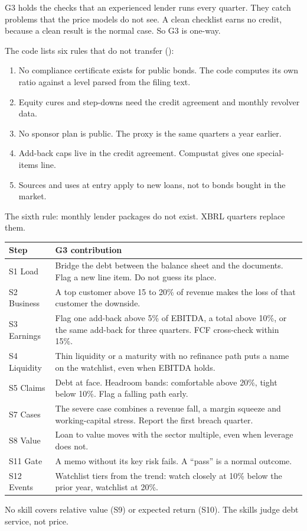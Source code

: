 G3 holds the checks that an experienced lender runs every quarter. They catch problems that the price models do not see. A clean checklist earns no credit, because a clean result is the normal case. So G3 is one-way.

The code lists six rules that do not transfer ():
\begin{enumerate}
\item No compliance certificate exists for public bonds. The code computes its own ratio against a level parsed from the filing text.
\item Equity cures and step-downs need the credit agreement and monthly revolver data.
\item No sponsor plan is public. The proxy is the same quarters a year earlier.
\item Add-back caps live in the credit agreement. Compustat gives one special-items line.
\item Sources and uses at entry apply to new loans, not to bonds bought in the market.
\end{enumerate}
The sixth rule: monthly lender packages do not exist. XBRL quarters replace them.

{\footnotesize
\begin{tabularx}{\linewidth}{@{}>{\raggedright\arraybackslash}p{24mm}>{\raggedright\arraybackslash}X@{}}
\toprule
Step & G3 contribution \\
\midrule
S1 Load & Bridge the debt between the balance sheet and the documents. Flag a new line item. Do not guess its place. \\
S2 Business & A top customer above 15 to 20\% of revenue makes the loss of that customer the downside. \\
S3 Earnings & Flag one add-back above 5\% of EBITDA, a total above 10\%, or the same add-back for three quarters. FCF cross-check within 15\%. \\
S4 Liquidity & Thin liquidity or a maturity with no refinance path puts a name on the watchlist, even when EBITDA holds. \\
S5 Claims & Debt at face. Headroom bands: comfortable above 20\%, tight below 10\%. Flag a falling path early. \\
S7 Cases & The severe case combines a revenue fall, a margin squeeze and working-capital stress. Report the first breach quarter. \\
S8 Value & Loan to value moves with the sector multiple, even when leverage does not. \\
S11 Gate & A memo without its key risk fails. A ``pass'' is a normal outcome. \\
S12 Events & Watchlist tiers from the trend: watch closely at 10\% below the prior year, watchlist at 20\%. \\
\bottomrule
\end{tabularx}
}
No skill covers relative value (S9) or expected return (S10). The skills judge debt service, not price.

